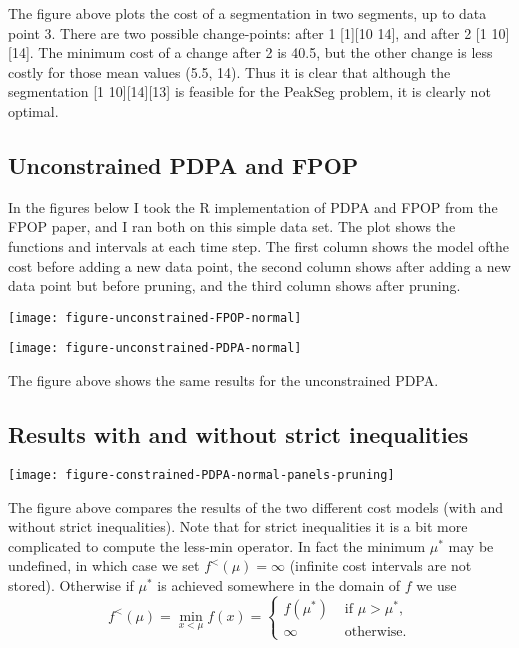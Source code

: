 \documentclass{article}
\begin{document}
The figure above plots the cost of a segmentation in two segments, up
to data point 3. There are two possible change-points: after 1 [1][10
14], and after 2 [1 10][14]. The minimum cost of a change after 2 is
40.5, but the other change is less costly for those mean values (5.5,
14). Thus it is clear that although the segmentation [1 10][14][13] is
feasible for the PeakSeg problem, it is clearly not optimal.

\subsection{Unconstrained PDPA and FPOP}

In the figures below I took the R implementation of PDPA and FPOP from
the FPOP paper, and I ran both on this simple data set. The plot shows
the functions and intervals at each time step. The first column shows
the model ofthe cost before adding a new data point, the second column
shows after adding a new data point but before pruning, and the third
column shows after pruning.

\texttt{[image: figure-unconstrained-FPOP-normal]}

\texttt{[image: figure-unconstrained-PDPA-normal]}

The figure above shows the same results for the unconstrained PDPA.

\subsection{Results with and without strict inequalities}

\texttt{[image: figure-constrained-PDPA-normal-panels-pruning]}

The figure above compares the results of the two different cost models
(with and without strict inequalities). Note that for strict
inequalities it is a bit more complicated to compute the less-min
operator. In fact the minimum $\mu^*$ may be undefined, in which case
we set $f^{<}(\mu)=\infty$ (infinite cost intervals are not
stored). Otherwise if $\mu^*$ is achieved somewhere in the domain of
$f$ we use
\begin{equation*}
  f^{<}(\mu) = \min_{x<\mu}f(x) = 
  \begin{cases}
    f(\mu^*) & \text{ if } \mu > \mu^*,\\
    \infty & \text{ otherwise.}
  \end{cases}
\end{equation*}
\end{document}
